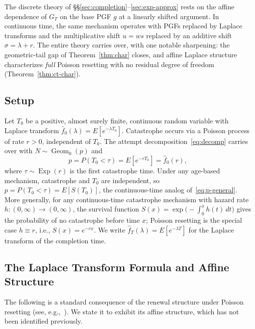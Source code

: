\documentclass[11pt]{article}
\theoremstyle{plain}
\theoremstyle{definition}
\theoremstyle{remark}
\DeclareMathOperator{\Exp}{Exp}
\DeclareMathOperator{\Geom}{Geom}
\begin{document}
The discrete theory of \S\S\ref{sec:completion}--\ref{sec:exp-approx} rests on the affine dependence of $G_T$ on the base PGF $g$ at a linearly shifted argument.  In continuous time, the same mechanism operates with PGFs replaced by Laplace transforms and the multiplicative shift $u = ws$ replaced by an additive shift $\sigma = \lambda + r$.  The entire theory carries over, with one notable sharpening: the geometric-tail gap of Theorem~\ref{thm:char} closes, and affine Laplace structure characterizes \emph{full} Poisson resetting with no residual degree of freedom (Theorem~\ref{thm:ct-char}).

\subsection{Setup}\label{sec:ct-setup}



Let $T_0$ be a positive, almost surely finite, continuous random variable with Laplace transform $\hat{f}_0(\lambda) = E[e^{-\lambda T_0}]$.  Catastrophe occurs via a Poisson process of rate $r > 0$, independent of $T_0$.  The attempt decomposition~\eqref{eq:decomp} carries over with $N \sim \Geom_0(p)$ and
\begin{equation}\label{eq:p-ct}
  p = P(T_0 < \tau) = E[e^{-rT_0}] = \hat{f}_0(r),
\end{equation}
where $\tau \sim \Exp(r)$ is the first catastrophe time. Under any age-based mechanism, catastrophe and $T_0$ are independent, so $p = P(T_0 < \tau) = E[S(T_0)]$, the continuous-time analog of~\eqref{eq:p-general}. More generally, for any continuous-time catastrophe mechanism with hazard rate $h: (0,\infty) \to (0,\infty)$, the survival function $S(x) = \exp\bigl(-\int_0^x h(t)\,dt\bigr)$ gives the probability of no catastrophe before time $x$; Poisson resetting is the special case $h \equiv r$, i.e., $S(x) = e^{-rx}$.  We write $\hat{f}_T(\lambda) = E[e^{-\lambda T}]$ for the Laplace transform of the completion time. %

\subsection{The Laplace Transform Formula and Affine Structure}\label{sec:ct-formula}

The following is a standard consequence of the renewal structure under Poisson resetting (see, e.g.,~\cite{EMS20, CS18}).  We state it to exhibit its affine structure, which has not been identified previously.
\end{document}
